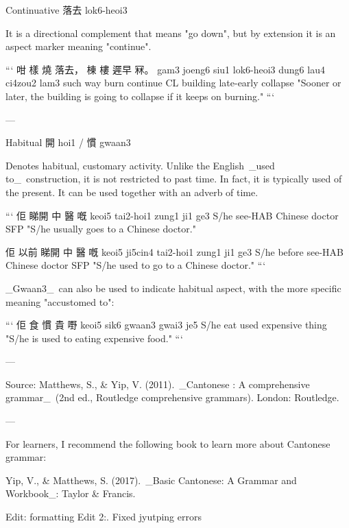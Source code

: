 Continuative 落去 lok6-heoi3

It is a directional complement that means "go down", but by extension it is an aspect marker meaning "continue".

```
咁    樣     燒    落去，      棟    樓         遲早       冧。  
gam3  joeng6 siu1 lok6-heoi3  dung6 lau4      ci4zou2    lam3  
such  way    burn continue    CL    building  late-early collapse
"Sooner or later, the building is going to collapse if it keeps on burning."  
```

---

Habitual 開 hoi1 / 慣 gwaan3

Denotes habitual, customary activity. Unlike the English _used to_ construction, it is not restricted to past time. In fact, it is typically used of the present. It can be used together with an adverb of time.

```
佢    睇開       中       醫      嘅  
keoi5 tai2-hoi1 zung1    ji1     ge3
S/he  see-HAB   Chinese  doctor  SFP
"S/he usually goes to a Chinese doctor."  

佢    以前      睇開       中       醫      嘅  
keoi5 ji5cin4  tai2-hoi1 zung1    ji1     ge3
S/he  before   see-HAB   Chinese  doctor  SFP
"S/he used to go to a Chinese doctor."
```

_Gwaan3_ can also be used to indicate habitual aspect, with the more specific meaning "accustomed to":

```
佢    食  慣        貴          嘢
keoi5 sik6 gwaan3   gwai3      je5
S/he  eat used      expensive  thing 
"S/he is used to eating expensive food."
```

---

Source: Matthews, S., & Yip, V. (2011). _Cantonese : A comprehensive grammar_ (2nd ed., Routledge comprehensive grammars). London: Routledge.

---

For learners, I recommend the following book to learn more about Cantonese grammar:

Yip, V., & Matthews, S. (2017). _Basic Cantonese: A Grammar and Workbook_: Taylor & Francis.

Edit: formatting Edit 2:. Fixed jyutping errors